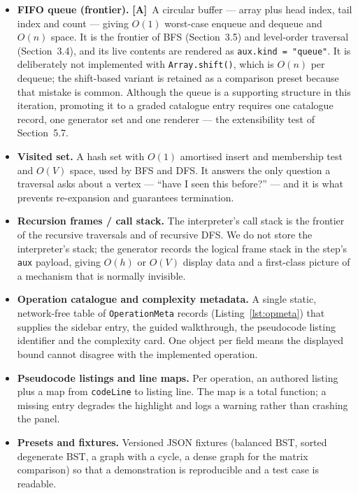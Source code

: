 \documentclass[11pt,a4paper]{article}
\newcommand{\A}{\textcolor{asmc}{\textbf{[A]}}}     %
\newcommand{\ct}[1]{\texttt{#1}}
\begin{document}
\begin{itemize}[leftmargin=1.4em,topsep=2pt,itemsep=3pt]
  \item \textbf{FIFO queue (frontier).} \A\ A circular buffer --- array plus head index, tail index
        and count --- giving $O(1)$ worst-case enqueue and dequeue and $O(n)$ space. It is the
        frontier of BFS (Section~3.5) and level-order traversal (Section~3.4), and its live
        contents are rendered as \ct{aux.kind = "queue"}. It is deliberately not implemented with
        \ct{Array.shift()}, which is $O(n)$ per dequeue; the shift-based variant is retained as a
        comparison preset because that mistake is common. Although the queue is a supporting
        structure in this iteration, promoting it to a graded catalogue entry requires one
        catalogue record, one generator set and one renderer --- the extensibility test of
        Section~5.7.
  \item \textbf{Visited set.} A hash set with $O(1)$ amortised insert and membership test and
        $O(V)$ space, used by BFS and DFS. It answers the only question a traversal asks about a
        vertex --- ``have I seen this before?'' --- and it is what prevents re-expansion and
        guarantees termination.
  \item \textbf{Recursion frames / call stack.} The interpreter's call stack is the frontier of
        the recursive traversals and of recursive DFS. We do not store the interpreter's stack;
        the generator records the logical frame stack in the step's \ct{aux} payload, giving
        $O(h)$ or $O(V)$ display data and a first-class picture of a mechanism that is normally
        invisible.
  \item \textbf{Operation catalogue and complexity metadata.} A single static, network-free table of
        \ct{OperationMeta} records (Listing~\ref{lst:opmeta}) that supplies the sidebar entry, the
        guided walkthrough, the pseudocode listing identifier and the complexity card. One object
        per field means the displayed bound cannot disagree with the implemented operation.
  \item \textbf{Pseudocode listings and line maps.} Per operation, an authored listing plus a map
        from \ct{codeLine} to listing line. The map is a total function; a missing entry degrades
        the highlight and logs a warning rather than crashing the panel.
  \item \textbf{Presets and fixtures.} Versioned JSON fixtures (balanced BST, sorted degenerate
        BST, a graph with a cycle, a dense graph for the matrix comparison) so that a demonstration
        is reproducible and a test case is readable.
\end{itemize}
\end{document}
